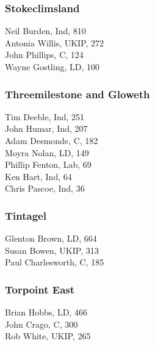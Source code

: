 \documentclass[a4paper,openany,10pt]{book}
\begin{document}
\subsubsection*{Stokeclimsland}



Neil Burden, Ind, 810\\
Antonia Willis, UKIP, 272\\
John Phillips, C, 124\\
Wayne Gostling, LD, 100\\


\subsubsection*{Threemilestone and Gloweth}



Tim Deeble, Ind, 251\\
John Humar, Ind, 207\\
Adam Desmonde, C, 182\\
Moyra Nolan, LD, 149\\
Phillip Fenton, Lab, 69\\
Ken Hart, Ind, 64\\
Chris Pascoe, Ind, 36\\


\subsubsection*{Tintagel}



Glenton Brown, LD, 664\\
Susan Bowen, UKIP, 313\\
Paul Charlesworth, C, 185\\


\subsubsection*{Torpoint East}



Brian Hobbs, LD, 466\\
John Crago, C, 300\\
Rob White, UKIP, 265\\
\end{document}
